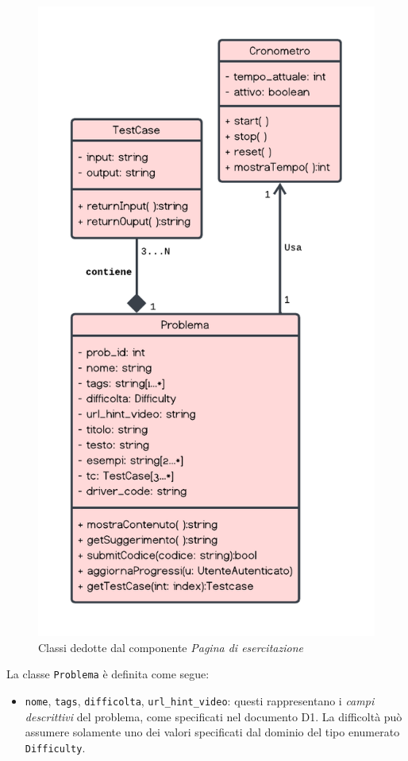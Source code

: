 \documentclass[11pt, a4paper]{article}
\theoremstyle{definition} %
\begin{document}
\begin{figure}[H]
\centering
\includegraphics[scale = 0.8]{materiale/class-esercitazione.pdf}
\caption{Classi dedotte dal componente \textit{Pagina di esercitazione}}
\label{esercitaz}
\end{figure}
La classe \texttt{Problema} è definita come segue:
\begin{itemize}
    \item \texttt{nome}, \texttt{tags}, \texttt{difficolta}, \texttt{url\_hint\_video}:
    questi rappresentano i \textit{campi descrittivi} del problema, come specificati nel
    documento D1. La difficoltà può assumere solamente uno dei valori
    specificati dal dominio del tipo enumerato \texttt{Difficulty}.
\end{itemize}
\end{document}
